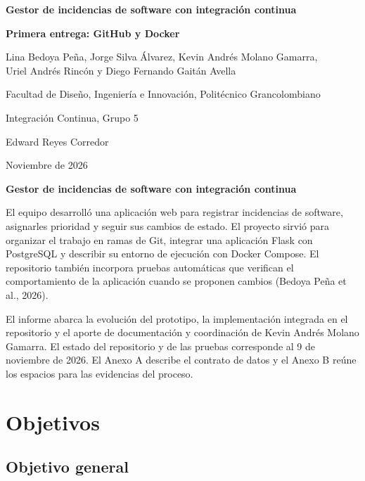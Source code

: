 \documentclass[12pt,letterpaper]{article}
\newcommand{\tituloinforme}{Gestor de incidencias de software con integración continua}
\newcommand{\fechaentrega}{Noviembre de 2026} %
\begin{document}
\vspace*{3\baselineskip}
\begin{center}
  \textbf{\tituloinforme}\par
  \textbf{Primera entrega: GitHub y Docker}\par
  \vspace{\baselineskip}
  Lina Bedoya Peña, Jorge Silva Álvarez, Kevin Andrés Molano Gamarra,\\
  Uriel Andrés Rincón y Diego Fernando Gaitán Avella\par
  Facultad de Diseño, Ingeniería e Innovación, Politécnico Grancolombiano\par
  Integración Continua, Grupo 5\par
  Edward Reyes Corredor\par
  \fechaentrega\par
\end{center}

\clearpage
\renewcommand{\contentsname}{Tabla de contenido}
\tableofcontents

\clearpage
{}
{}
\begin{center}
  \textbf{\tituloinforme}
\end{center}

El equipo desarrolló una aplicación web para registrar incidencias de software, asignarles prioridad y seguir sus cambios de estado. El proyecto sirvió para organizar el trabajo en ramas de Git, integrar una aplicación Flask con PostgreSQL y describir su entorno de ejecución con Docker Compose. El repositorio también incorpora pruebas automáticas que verifican el comportamiento de la aplicación cuando se proponen cambios (Bedoya Peña et al., 2026).

El informe abarca la evolución del prototipo, la implementación integrada en el repositorio y el aporte de documentación y coordinación de Kevin Andrés Molano Gamarra. El estado del repositorio y de las pruebas corresponde al 9 de noviembre de 2026. El Anexo A describe el contrato de datos y el Anexo B reúne los espacios para las evidencias del proceso.

\section{Objetivos}

\subsection{Objetivo general}
\end{document}
